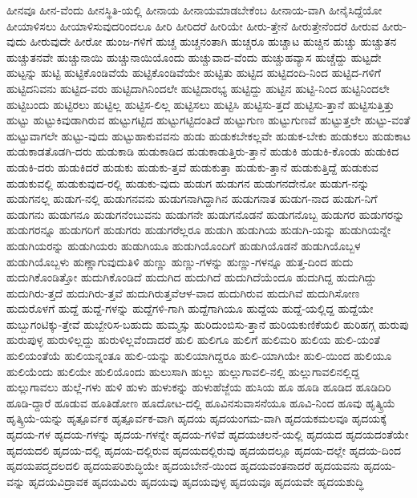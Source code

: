 {ಹೀನವೂ
ಹೀನ-ವೆಂದು
ಹೀನಸ್ಥಿತಿ-ಯಲ್ಲಿ
ಹೀನಾಯ
ಹೀನಾಯಮಾಡಬೇಕೆಂಬ
ಹೀನಾಯ-ವಾಗಿ
ಹೀನೈಸಿದ್ದೆಯೋ
ಹೀಯಾಳಿಸಲು
ಹೀಯಾಳಿಸುವುದರಿಂದಲೂ
ಹೀರಿ
ಹೀರಿದರೆ
ಹೀರಿಯೇ
ಹೀರು-ತ್ತೇನೆ
ಹೀರುತ್ತೇನೆಂದರೆ
ಹೀರುವ
ಹೀರು-ವುದು
ಹೀರುವುದೇ
ಹೀರೋ
ಹುಂಜ-ಗಳಿಗೆ
ಹುಚ್ಚ
ಹುಚ್ಚನಂತಾಗಿ
ಹುಚ್ಚರೂ
ಹುಚ್ಚಾಟ
ಹುಚ್ಚಿನ
ಹುಚ್ಚು
ಹುಚ್ಚುತನ
ಹುಚ್ಚುತನವೇ
ಹುಚ್ಚುನಾಯಿ
ಹುಚ್ಚುನಾಯಿಯೊಂದು
ಹುಚ್ಚುವಾದ-ವೆಂದು
ಹುಚ್ಚುಹವ್ಯಾಸ
ಹುಚ್ಚೆದ್ದು
ಹುಟ್ಟದೇ
ಹುಟ್ಟನ್ನು
ಹುಟ್ಟಿ
ಹುಟ್ಟಿಕೊಂಡಿವೆಯೆ
ಹುಟ್ಟಿಕೊಂಡಿವೆಯೇ
ಹುಟ್ಟಿತು
ಹುಟ್ಟಿದ
ಹುಟ್ಟಿದಂದಿ-ನಿಂದ
ಹುಟ್ಟಿದ-ಗಳಿಗೆ
ಹುಟ್ಟಿದನಿವನು
ಹುಟ್ಟಿದ-ವರು
ಹುಟ್ಟಿದಾಗಿನಿಂದಲೇ
ಹುಟ್ಟಿದಾರಭ್ಯ
ಹುಟ್ಟಿದ್ದು
ಹುಟ್ಟಿನ
ಹುಟ್ಟಿ-ನಿಂದ
ಹುಟ್ಟಿನಿಂದಲೇ
ಹುಟ್ಟಿಬಂದು
ಹುಟ್ಟಿರಲು
ಹುಟ್ಟಿಲ್ಲ
ಹುಟ್ಟಿಸ-ಲಿಲ್ಲ
ಹುಟ್ಟಿಸಲು
ಹುಟ್ಟಿಸಿ
ಹುಟ್ಟಿಸು-ತ್ತದೆ
ಹುಟ್ಟಿಸು-ತ್ತಾನೆ
ಹುಟ್ಟಿಸುತ್ತಿತ್ತು
ಹುಟ್ಟು
ಹುಟ್ಟುಕಿವುಡಾಗಿರುವ
ಹುಟ್ಟುಗಟ್ಟಿದ
ಹುಟ್ಟುಗಟ್ಟಿದಂತಿದೆ
ಹುಟ್ಟುಗುಣ
ಹುಟ್ಟುಗುಣವೆ
ಹುಟ್ಟುತ್ತಲೇ
ಹುಟ್ಟು-ವಂತೆ
ಹುಟ್ಟುವಾಗಲೇ
ಹುಟ್ಟು-ವುದು
ಹುಟ್ಟುಹಾಕುವವನು
ಹುಡು
ಹುಡುಕಬೇಕಲ್ಲವೇ
ಹುಡುಕ-ಬೇಕು
ಹುಡುಕಲು
ಹುಡುಕಾಟ
ಹುಡುಕಾಡತೊಡಗಿ-ದರು
ಹುಡುಕಾಡಿ
ಹುಡುಕಾಡಿದ
ಹುಡುಕಾಡುತ್ತಿರು-ತ್ತಾನೆ
ಹುಡುಕಿ
ಹುಡುಕಿ-ಕೊಂಡು
ಹುಡುಕಿದ
ಹುಡುಕಿ-ದರು
ಹುಡುಕಿದರೆ
ಹುಡುಕು
ಹುಡುಕು-ತ್ತವೆ
ಹುಡುಕುತ್ತಾ
ಹುಡುಕು-ತ್ತಾನೆ
ಹುಡುಕುತ್ತಿದ್ದೆ
ಹುಡುಕುವ
ಹುಡುಕುವಲ್ಲಿ
ಹುಡುಕುವುದ-ರಲ್ಲಿ
ಹುಡುಕು-ವುದು
ಹುಡುಗ
ಹುಡುಗನ
ಹುಡುಗನದೇನೋ
ಹುಡುಗ-ನನ್ನು
ಹುಡುಗನಲ್ಲ
ಹುಡುಗ-ನಲ್ಲಿ
ಹುಡುಗನವನು
ಹುಡುಗನಾಗಿದ್ದಾಗಿನ
ಹುಡುಗನಾತ
ಹುಡುಗ-ನಾದ
ಹುಡುಗ-ನಿಗೆ
ಹುಡುಗನು
ಹುಡುಗನೂ
ಹುಡುಗನೆಂಬುವನು
ಹುಡುಗನೇ
ಹುಡುಗನೊಡನೆ
ಹುಡುಗನೊಬ್ಬ
ಹುಡುಗರ
ಹುಡುಗರನ್ನು
ಹುಡುಗರನ್ನೂ
ಹುಡುಗರಿಗೆ
ಹುಡುಗರು
ಹುಡುಗರೆಲ್ಲರೂ
ಹುಡುಗಿ
ಹುಡುಗಿಯ
ಹುಡುಗಿ-ಯನ್ನು
ಹುಡುಗಿಯನ್ನೇ
ಹುಡುಗಿಯರನ್ನು
ಹುಡುಗಿಯರು
ಹುಡುಗಿಯೂ
ಹುಡುಗಿಯೊಂದಿಗೆ
ಹುಡುಗಿಯೊಡನೆ
ಹುಡುಗಿಯೊಬ್ಬಳ
ಹುಡುಗಿಯೊಬ್ಬಳು
ಹುಣ್ಣಾಗುವುದುತಿಳಿ
ಹುಣ್ಣು
ಹುಣ್ಣು-ಗಳನ್ನು
ಹುಣ್ಣು-ಗಳನ್ನೂ
ಹುತ್ತ-ದಿಂದ
ಹುದು
ಹುದುಗಿಕೊಂಡಿತ್ತೋ
ಹುದುಗಿಕೊಂಡಿದೆ
ಹುದುಗಿದ
ಹುದುಗಿದೆ
ಹುದುಗಿದೆಯೆಂದೂ
ಹುದುಗಿದ್ದ
ಹುದುಗಿದ್ದು
ಹುದುಗಿರು-ತ್ತದೆ
ಹುದುಗಿರು-ತ್ತವೆ
ಹುದುಗಿರುತ್ತವೆಆಳ-ವಾದ
ಹುದುಗಿರುವ
ಹುದುಗಿವೆ
ಹುದುಗಿಸೋಣ
ಹುದುರೊಳಗೆ
ಹುದ್ದೆ
ಹುದ್ದೆ-ಗಳನ್ನು
ಹುದ್ದೆಗಳಿ-ಗಾಗಿ
ಹುದ್ದೆಗಾಗಿಯೂ
ಹುದ್ದೆಯ
ಹುದ್ದೆ-ಯಲ್ಲಿದ್ದ
ಹುದ್ದೆಯೇ
ಹುಬ್ಬುಗಂಟಿಕ್ಕು-ತ್ತೇವೆ
ಹುಬ್ಬೇರಿಸ-ಬಹುದು
ಹುಮ್ಮಸ್ಸು
ಹುರಿದುಂಬಿಸು-ತ್ತಾನೆ
ಹುರಿಯಕುಣಿಕೆಯಲಿ
ಹುರಿಹಗ್ಗ
ಹುರುಪು
ಹುರುಪುಳ್ಳ
ಹುರುಳಿಲ್ಲದ್ದು
ಹುರುಳಿಲ್ಲವೆಂದಾದರೆ
ಹುಲಿ
ಹುಲಿಗೂ
ಹುಲಿಗೆ
ಹುಲಿಮರಿ
ಹುಲಿಯ
ಹುಲಿ-ಯಂತೆ
ಹುಲಿಯಂತೆಯೆ
ಹುಲಿಯನ್ನಂತೂ
ಹುಲಿ-ಯನ್ನು
ಹುಲಿಯಾಗಿದ್ದರೂ
ಹುಲಿ-ಯಾಗಿಯೇ
ಹುಲಿ-ಯಿಂದ
ಹುಲಿಯೂ
ಹುಲಿಯೆಂದು
ಹುಲಿಯೇ
ಹುಲಿಯೊಂದು
ಹುಲುಸಾಗಿ
ಹುಲ್ಲು
ಹುಲ್ಲುಗಾವಲಿ-ನಲ್ಲಿ
ಹುಲ್ಲುಗಾವಲಿನಲ್ಲಿದ್ದ
ಹುಲ್ಲುಗಾವಲು
ಹುಲ್ಲೆ-ಗಳು
ಹುಳಿ
ಹುಳು
ಹುಳುಕನ್ನು
ಹುಳುಹೆಜ್ಜೆಯ
ಹುಸಿಯ
ಹೂ
ಹೂಡಿ
ಹೂಡಿದ
ಹೂಡಿದಿರಿ
ಹೂಡಿ-ದ್ದಾರೆ
ಹೂಡುವ
ಹೂತಿಡೋಣ
ಹೂದೋಟ-ದಲ್ಲಿ
ಹೂವಿನಸುವಾಸನೆಯೂ
ಹೂವಿ-ನಿಂದ
ಹೂವು
ಹೃತ್ಕ್ರಿಯೆ
ಹೃತ್ಕ್ರಿಯೆ-ಯನ್ನು
ಹೃತ್ಪೂರ್ವಕ
ಹೃತ್ಪೂರ್ವಕ-ವಾಗಿ
ಹೃದಯ
ಹೃದಯಂಗಮ-ವಾಗಿ
ಹೃದಯಕಮಲವೂ
ಹೃದಯಕ್ಕೆ
ಹೃದಯ-ಗಳ
ಹೃದಯ-ಗಳನ್ನು
ಹೃದಯ-ಗಳನ್ನೇ
ಹೃದಯ-ಗಳಿವೆ
ಹೃದಯಚಲನೆ-ಯಲ್ಲಿ
ಹೃದಯದ
ಹೃದಯದಂತೆಯೇ
ಹೃದಯದಲಿ
ಹೃದಯ-ದಲ್ಲಿ
ಹೃದಯ-ದಲ್ಲಿರುವ
ಹೃದಯದಲ್ಲಿರುವು
ಹೃದಯದಲ್ಲೂ
ಹೃದಯ-ದಲ್ಲೇ
ಹೃದಯ-ದಿಂದ
ಹೃದಯಪದ್ಮದಲದಲಿ
ಹೃದಯಪರಿಶುದ್ಧಿಯೇ
ಹೃದಯಬೇನೆ-ಯಿಂದ
ಹೃದಯವಂತನಾದರೆ
ಹೃದಯವನು
ಹೃದಯ-ವನ್ನು
ಹೃದಯವಿದ್ರಾವಕ
ಹೃದಯವಿರು
ಹೃದಯವು
ಹೃದಯವುಳ್ಳ
ಹೃದಯವೂ
ಹೃದಯವೇ
ಹೃದಯಶುದ್ಧಿ
}
